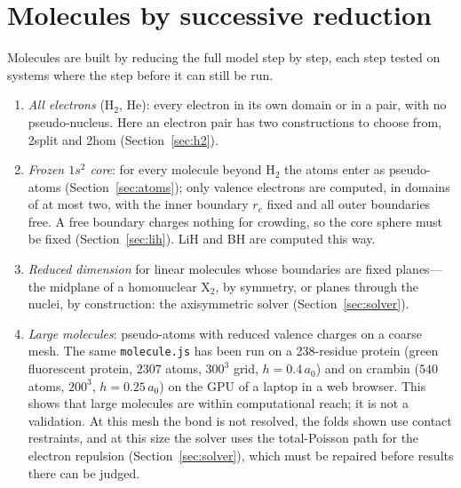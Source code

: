 \documentclass[11pt]{article}
\begin{document}

\section{Molecules by successive reduction}
\label{sec:reduction}

Molecules are built by reducing the full model step by step, each step tested on systems where the
step before it can still be run.
\begin{enumerate}
\item \emph{All electrons} (H$_2$, He): every electron in its own domain or in a pair, with no
  pseudo-nucleus. Here an electron pair has two constructions to choose from, 2split and 2hom
  (Section~\ref{sec:h2}).
\item \emph{Frozen $1s^2$ core}: for every molecule beyond H$_2$ the atoms enter as pseudo-atoms
  (Section~\ref{sec:atoms}); only valence electrons are computed, in domains of at most two, with
  the inner boundary $r_c$ fixed and all outer boundaries free. A free boundary charges nothing for
  crowding, so the core sphere must be fixed (Section~\ref{sec:lih}). LiH and BH are computed this way.
\item \emph{Reduced dimension} for linear molecules whose boundaries are fixed planes---the
  midplane of a homonuclear X$_2$, by symmetry, or planes through the nuclei, by construction: the
  axisymmetric solver (Section~\ref{sec:solver}).
\item \emph{Large molecules}: pseudo-atoms with reduced valence charges on a coarse mesh. The same
  \texttt{molecule.js} has been run on a 238-residue protein (green fluorescent protein, $2307$ atoms,
  $300^3$ grid, $h = 0.4\,a_0$) and on crambin ($540$ atoms, $200^3$, $h = 0.25\,a_0$) on the GPU of a
  laptop in a web browser. %
  This shows that large molecules are within computational reach; it is not a validation. At this
  mesh the bond is not resolved, the folds shown use contact restraints, and at this size the solver
  uses the total-Poisson path for the electron repulsion (Section~\ref{sec:solver}), which must be
  repaired before results there can be judged.
\end{enumerate}
\end{document}
